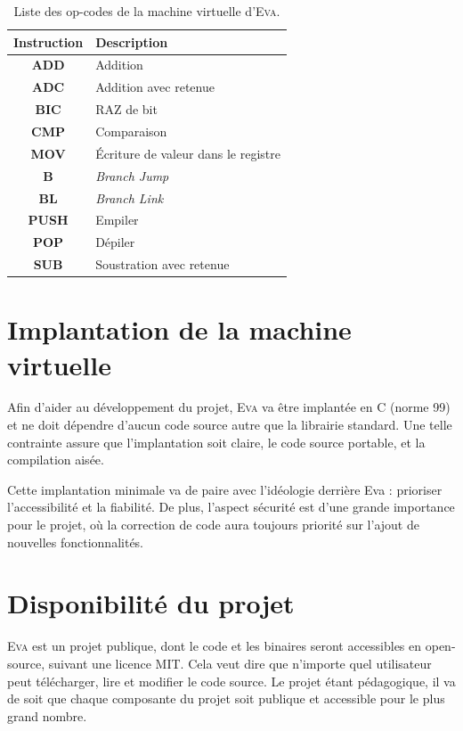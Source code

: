 \documentclass[11pt,twoside,french]{article}
\newcommand{\noun}[1]{\textsc{#1}}
\newcommand{\noun}[1]{\textsc{#1}}
\begin{document}
\begin{table}[p]
\begin{centering}
\begin{tabular}{|c|l|}
\hline
\textbf{Instruction} & \textbf{Description}\\
\hline
\hline
\textbf{ADD} & Addition\\
\hline
\textbf{ADC} & Addition avec retenue\\
\hline
\textbf{BIC} & RAZ de bit\\
\hline
\textbf{CMP} & Comparaison\\
\hline
\textbf{MOV} & Écriture de valeur dans le registre\\
\hline
\textbf{B} & \emph{Branch Jump}\\
\hline
\textbf{BL} & \emph{Branch Link}\\
\hline
\textbf{PUSH} & Empiler\\
\hline
\textbf{POP} & Dépiler\\
\hline
\textbf{SUB} & Soustration avec retenue\\
\hline
\end{tabular}
\par\end{centering}
\caption{Liste des op-codes de la machine virtuelle d'\noun{Eva}.}
\label{tab:opcodes}
\end{table}


\section{Implantation de la machine virtuelle}

Afin d'aider au développement du projet, \noun{Eva} va être implantée
en C (norme 99) et ne doit dépendre d'aucun code source autre que
la librairie standard. Une telle contrainte assure que l'implantation
soit claire, le code source portable, et la compilation aisée.

Cette implantation minimale va de paire avec l'idéologie derrière
Eva : prioriser l'accessibilité et la fiabilité. De plus, l'aspect
sécurité est d'une grande importance pour le projet, où la correction
de code aura toujours priorité sur l'ajout de nouvelles fonctionnalités.

\section{Disponibilité du projet}

\noun{Eva} est un projet publique, dont le code et les binaires seront
accessibles en open-source, suivant une licence MIT. Cela veut dire
que n'importe quel utilisateur peut télécharger, lire et modifier
le code source. Le projet étant pédagogique, il va de soit que chaque
composante du projet soit publique et accessible pour le plus grand nombre.
\end{document}
